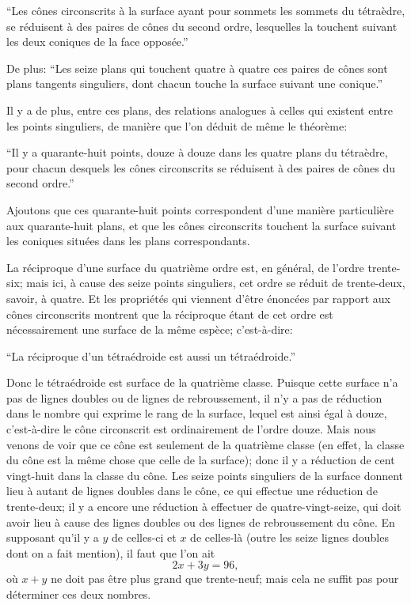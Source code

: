 \documentclass[12pt,a4paper]{article}
\begin{document}
``Les c\^ones circonscrits \`a la surface ayant pour sommets les sommets du t\'etra\`edre, se r\'eduisent \`a des paires de c\^ones du second ordre, lesquelles la touchent suivant les deux coniques de la face oppos\'ee.''

De plus: ``Les seize plans qui touchent quatre \`a quatre ces paires de c\^ones sont plans tangents singuliers, dont chacun touche la surface suivant une conique.''

Il y a de plus, entre ces plans, des relations analogues \`a celles qui existent entre les points singuliers, de mani\`ere que l'on d\'eduit de m\^eme le th\'eor\`eme:

``Il y a quarante-huit points, douze \`a douze dans les quatre plans du t\'etra\`edre, pour chacun desquels les c\^ones circonscrits se r\'eduisent \`a des paires de c\^ones du second ordre.''

Ajoutons que ces quarante-huit points correspondent d'une mani\`ere particuli\`ere aux quarante-huit plans, et que les c\^ones circonscrits touchent la surface suivant les coniques situ\'ees dans les plans correspondants.

La r\'eciproque d'une surface du quatri\`eme ordre est, en g\'en\'eral, de l'ordre trente-six; mais ici, \`a cause des seize points singuliers, cet ordre se r\'eduit de trente-deux, savoir, \`a quatre. Et les propri\'et\'es qui viennent d'\^etre \'enonc\'ees par rapport aux c\^ones circonscrits montrent que la r\'eciproque \'etant de cet ordre est n\'ecessairement une surface de la m\^eme esp\`ece; c'est-\`a-dire:

``La r\'eciproque d'un t\'etra\'edroide est aussi un t\'etra\'edroide.''

Donc le t\'etra\'edroide est surface de la quatri\`eme classe. Puisque cette surface n'a pas de lignes doubles ou de lignes de rebroussement, il n'y a pas de r\'eduction dans le nombre qui exprime le rang de la surface, lequel est ainsi \'egal \`a douze, c'est-\`a-dire le c\^one circonscrit est ordinairement de l'ordre douze. Mais nous venons de voir que ce c\^one est seulement de la quatri\`eme classe (en effet, la classe du c\^one est la m\^eme chose que celle de la surface); donc il y a r\'eduction de cent vingt-huit dans la classe du c\^one. Les seize points singuliers de la surface donnent lieu \`a autant de lignes doubles dans le c\^one, ce qui effectue une r\'eduction de trente-deux; il y a encore une r\'eduction \`a effectuer de quatre-vingt-seize, qui doit avoir lieu \`a cause des lignes doubles ou des lignes de rebroussement du c\^one. En supposant qu'il y a $y$ de celles-ci et $x$ de celles-l\`a (outre les seize lignes doubles dont on a fait mention), il faut que l'on ait
\[
2x + 3y = 96,
\]
o\`u $x + y$ ne doit pas \^etre plus grand que trente-neuf; mais cela ne suffit pas pour d\'eterminer ces deux nombres.
\end{document}
